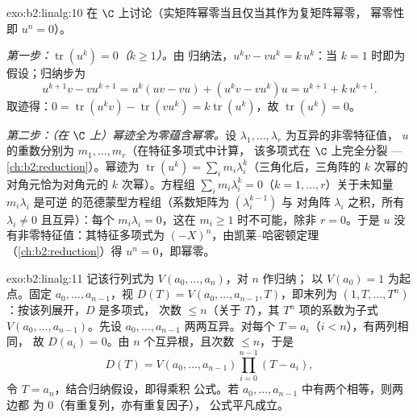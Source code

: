 \begin{solution}{exo:b2:linalg:10}
在 $\C$ 上讨论（实矩阵幂零当且仅当其作为复矩阵幂零，
幂零性即 $u^n = 0$）。

\emph{第一步：$\operatorname{tr}(u^k) = 0$（$k \geq 1$）。}由
归纳法，$u^k v - v u^k = k\, u^k$：当 $k = 1$ 时即为
假设；归纳步为
\[
u^{k+1}v - vu^{k+1} = u^k(uv - vu) + (u^k v - v u^k)u
= u^{k+1} + k\,u^{k+1} .
\]
取迹得：$0 = \operatorname{tr}(u^k v) -
\operatorname{tr}(vu^k) = k \operatorname{tr}(u^k)$，故
$\operatorname{tr}(u^k) = 0$。

\emph{第二步：（在 $\C$ 上）幂迹全为零蕴含幂零。}设
$\lambda_1, \dots, \lambda_r$ 为互异的非零特征值，
$u$ 的重数分别为 $m_1, \dots, m_r$（在特征多项式中计算，
该多项式在 $\C$ 上完全分裂 ---
\cref{ch:b2:reduction}）。幂迹为 $\operatorname{tr}(u^k) =
\sum_i m_i \lambda_i^k$（三角化后，三角阵的
$k$ 次幂的对角元恰为对角元的 $k$ 次幂）。方程组 $\sum_i m_i
\lambda_i^k = 0$（$k = 1, \dots, r$）关于未知量 $m_i\lambda_i$ 是可逆
的范德蒙型方程组（系数矩阵为 $(\lambda_i^{k-1})$ 与
对角阵 $\lambda_i$ 之积，所有 $\lambda_i \neq 0$ 且互异）：每个 $m_i
\lambda_i = 0$，这在 $m_i \geq 1$ 时不可能，除非 $r = 0$。于是 $u$
没有非零特征值：其特征多项式为
$(-X)^n$，由凯莱–哈密顿定理（\cref{ch:b2:reduction}）得 $u^n
= 0$，即幂零。
\end{solution}

\begin{solution}{exo:b2:linalg:11}
记该行列式为 $V(a_0, \dots, a_n)$，对 $n$ 作归纳；
以 $V(a_0) = 1$ 为起点。固定 $a_0, \dots, a_{n-1}$，视 $D(T) =
V(a_0, \dots, a_{n-1}, T)$，即末列为 $(1,
T, \dots, T^n)$：按该列展开，$D$ 是多项式，
次数 $\leq n$（关于 $T$），其 $T^n$ 项的系数为子式
$V(a_0, \dots, a_{n-1})$。先设 $a_0, \dots,
a_{n-1}$ 两两互异。对每个 $T = a_i$（$i < n$），有两列相同，
故 $D(a_i) = 0$。由 $n$ 个互异根，且次数
$\leq n$，于是
\[
D(T) = V(a_0, \dots, a_{n-1}) \prod_{i=0}^{n-1}(T - a_i),
\]
令 $T = a_n$，结合归纳假设，即得乘积
公式。若 $a_0, \dots, a_{n-1}$ 中有两个相等，则两边都
为 $0$（有重复列，亦有重复因子），
公式平凡成立。
\end{solution}

